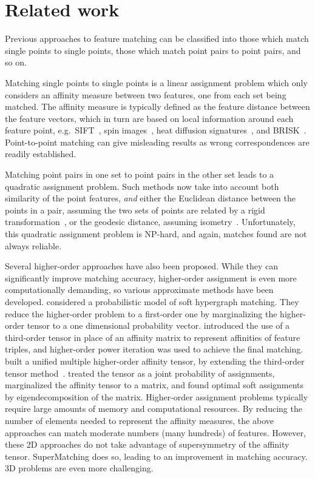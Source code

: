 \section{Related work}
\label{sec:related}

Previous approaches to feature matching can be classified into those which match single points to single points, those which match  point pairs to point pairs, and so on.

Matching single points to single points is a linear assignment problem which only considers an affinity measure between two features, one from each set being matched.
The affinity measure is typically defined as the feature distance between the feature vectors, which in turn are based on local information around each feature point,
e.g.\ SIFT~\cite{Lowe04}, spin images~\cite{Johnson99}, heat diffusion signatures~\cite{Sun09}, and BRISK~\cite{Leutenegger11}.
Point-to-point matching can give misleading results as wrong correspondences are readily established.

Matching point pairs  in one set to point pairs in the other set leads to a quadratic assignment problem.
Such methods now  take into account both similarity of the point features, \emph{and} either the Euclidean distance between the points in a pair,
assuming the two sets of points are related by a rigid transformation~\cite{Leordeanu05,Cour06}, or the geodesic distance, assuming isometry~\cite{li08,Tevs09,Ovsjanikov10,Tevs11,SahilliogluY11,Windheuser11}.
Unfortunately, this quadratic assignment problem is NP-hard, and again, matches found are not always reliable.

Several higher-order approaches have also been proposed.
While they can significantly improve matching accuracy,
higher-order assignment  is even more computationally demanding, so various approximate methods have been developed.
\cite{Zass08} considered a probabilistic model of soft hypergraph matching.
They reduce the higher-order problem to a first-order one by marginalizing the higher-order tensor to a one dimensional probability vector.
\cite{Duchenne09} introduced the use of a third-order tensor in place of an affinity matrix to represent affinities of feature triples,
and higher-order power iteration was used to achieve the final matching.
\cite{Aiping10} built a unified multiple higher-order affinity tensor, by extending the third-order tensor method~\cite{Duchenne09}.
\cite{Chertok10} treated the tensor as a joint probability of assignments, marginalized the affinity tensor to a matrix,
and found optimal soft assignments by eigendecomposition of the matrix.
Higher-order assignment problems typically require large amounts of memory and computational resources. By reducing the number of elements needed to represent the affinity measures, the above approaches can match moderate numbers (many hundreds) of features. However, these 2D approaches do not take advantage of supersymmetry of the affinity tensor. SuperMatching does so, leading to an improvement in matching accuracy.
3D problems are even more challenging.

